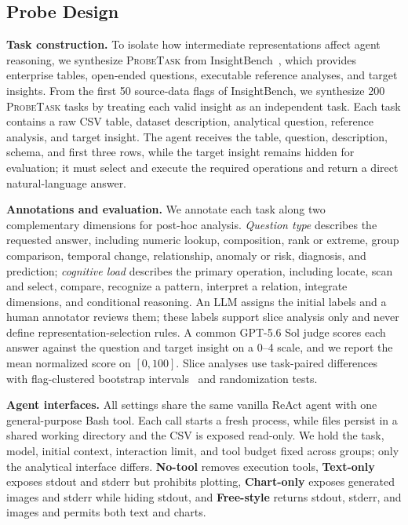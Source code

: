 \documentclass{article}
\newcommand{\probe}{\textsc{ProbeTask}}
\begin{document}
\subsection{Probe Design}
\label{sec:probe-setup}

\noindent\textbf{Task construction.}
To isolate how intermediate representations affect agent reasoning, we synthesize \probe{} from InsightBench~\citep{sahu2025insightbench}, which provides enterprise tables, open-ended questions, executable reference analyses, and target insights.
From the first 50 source-data flags of InsightBench, we synthesize 200 \probe{} tasks by treating each valid insight as an independent task.
Each task contains a raw CSV table, dataset description, analytical question, reference analysis, and target insight.
The agent receives the table, question, description, schema, and first three rows, while the target insight remains hidden for evaluation; it must select and execute the required operations and return a direct natural-language answer.

\noindent\textbf{Annotations and evaluation.}
We annotate each task along two complementary dimensions for post-hoc analysis.
\emph{Question type} describes the requested answer, including numeric lookup, composition, rank or extreme, group comparison, temporal change, relationship, anomaly or risk, diagnosis, and prediction; \emph{cognitive load} describes the primary operation, including locate, scan and select, compare, recognize a pattern, interpret a relation, integrate dimensions, and conditional reasoning.
An LLM assigns the initial labels and a human annotator reviews them; these labels support slice analysis only and never define representation-selection rules.
A common GPT-5.6 Sol judge scores each answer against the question and target insight on a 0--4 scale, and we report the mean normalized score on $[0,100]$.
Slice analyses use task-paired differences with flag-clustered bootstrap intervals~\citep{efron1993bootstrap} and randomization tests.

\noindent\textbf{Agent interfaces.}
All settings share the same vanilla ReAct agent with one general-purpose Bash tool.
Each call starts a fresh process, while files persist in a shared working directory and the CSV is exposed read-only.
We hold the task, model, initial context, interaction limit, and tool budget fixed across groups; only the analytical interface differs.
\textbf{No-tool} removes execution tools, \textbf{Text-only} exposes stdout and stderr but prohibits plotting, \textbf{Chart-only} exposes generated images and stderr while hiding stdout, and \textbf{Free-style} returns stdout, stderr, and images and permits both text and charts.
\end{document}
